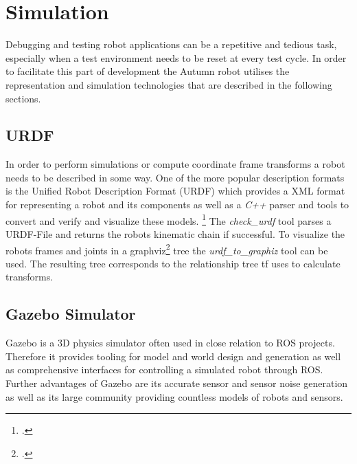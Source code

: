 \section{Simulation}
Debugging and testing robot applications can be a repetitive and tedious task, especially when a test environment needs to be reset at every test cycle. In order to facilitate this part of development the Autumn robot utilises the representation and simulation technologies that are described in the following sections.

\subsection{URDF}
In order to perform simulations or compute coordinate frame transforms a robot needs to be described in some way. One of the more popular description formats is the Unified Robot Description Format (URDF) which provides a XML format for representing a robot and its components as well as a \textit{C++} parser and tools to convert and verify and visualize these models. \footcite{openSourceRoboticsFoundationURDFNodate}
The \textit{check\_urdf} tool parses a URDF-File and returns the robots kinematic chain if successful.
To visualize the robots frames and joints in a graphviz\footcite{graphvizAuthorsAboutNodate} tree the \textit{urdf\_to\_graphiz} tool can be used. The resulting tree corresponds to the relationship tree tf uses to calculate transforms.

\subsection{Gazebo Simulator}
Gazebo is a 3D physics simulator often used in close relation to ROS projects. Therefore it provides tooling for model and world design and generation as well as comprehensive interfaces for controlling a simulated robot through ROS. Further advantages of Gazebo are its accurate sensor and sensor noise generation as well as its large community providing countless models of robots and sensors.

\filbreak